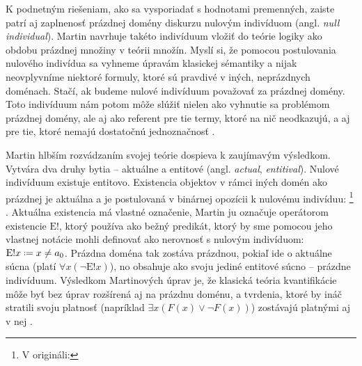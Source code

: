 \documentclass[12pt, letterpaper]{article}
\newcommand*{\defeq}{\mathrel{\vcenter{\baselineskip0.5ex \lineskiplimit0pt
                     \hbox{\scriptsize.}\hbox{\scriptsize.}}}%
                     =}
\begin{document}

K podnetným riešeniam, ako sa vysporiadať s hodnotami premenných, zaiste patrí aj zaplnenosť prázdnej domény diskurzu nulovým indivíduom (angl. \textit{null individual}). Martin navrhuje takéto indivíduum vložiť do teórie logiky ako obdobu prázdnej množiny v teórii množín. Myslí si, že pomocou postulovania nulového indivídua sa vyhneme úpravám klasickej sémantiky a nijak neovplyvníme niektoré formuly, ktoré sú pravdivé v iných, neprázdnych doménach. Stačí, ak budeme nulové indivíduum považovať za  prázdnej domény. Toto indivíduum nám potom môže slúžiť nielen ako vyhnutie sa problémom prázdnej domény, ale aj ako referent pre tie termy, ktoré na nič neodkazujú, a aj pre tie, ktoré nemajú dostatočnú jednoznačnosť \parencites[725--727]{MARTIN}.\par 

Martin hlbším rozvádzaním svojej teórie dospieva k zaujímavým výsledkom. Vytvára dva druhy bytia -- aktuálne a entitové (angl. \textit{actual}, \textit{entitival}).
Nulové indivíduum existuje entitovo. Existencia objektov v rámci iných domén ako prázdnej je aktuálna a je postulovaná v binárnej opozícii k nulovému indivíduu: \footnote{V origináli: } \parencites[vlastný preklad,][727]{MARTIN}. Aktuálna existencia má vlastné označenie, Martin ju označuje operátorom existencie $\text{E}!$, ktorý používa ako bežný predikát, ktorý by sme pomocou jeho vlastnej notácie mohli definovať ako nerovnosť s nulovým indivíduom: $\text{E}!x \defeq x \neq a_0$. Prázdna doména tak zostáva prázdnou, pokiaľ ide o aktuálne súcna (platí $\forall x (\neg\text{E}!x)$), no obsahuje ako svoju  jediné entitové súcno -- prázdne indivíduum. Výsledkom Martinových úprav je, že klasická teória kvantifikácie môže byť bez úprav rozšírená aj na prázdnu doménu, a tvrdenia, ktoré by ináč stratili svoju platnosť (napríklad $\exists x (F(x) \lor \neg F(x)) $) zostávajú platnými aj v nej \parencites[726--727, 736]{MARTIN}.\par
\end{document}
